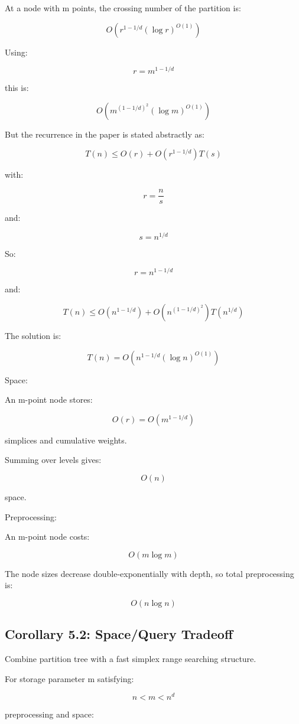 \documentclass[
  11pt,
]{article}
\begin{document}
At a node with m points, the crossing number of the partition is:

\[
O(r^{1-1/d}(\log r)^{O(1)})
\]

Using:

\[
r=m^{1-1/d}
\]

this is:

\[
O\left(m^{(1-1/d)^2}(\log m)^{O(1)}\right)
\]

But the recurrence in the paper is stated abstractly as:

\[
T(n)\le O(r)+O(r^{1-1/d})T(s)
\]

with:

\[
r=\frac{n}{s}
\]

and:

\[
s=n^{1/d}
\]

So:

\[
r=n^{1-1/d}
\]

and:

\[
T(n) \le O(n^{1-1/d}) + O(n^{(1-1/d)^2})T(n^{1/d})
\]

The solution is:

\[
T(n)=O(n^{1-1/d}(\log n)^{O(1)})
\]

Space:

An m-point node stores:

\[
O(r)=O(m^{1-1/d})
\]

simplices and cumulative weights.

Summing over levels gives:

\[
O(n)
\]

space.

Preprocessing:

An m-point node costs:

\[
O(m\log m)
\]

The node sizes decrease double-exponentially with depth, so total
preprocessing is:

\[
O(n\log n)
\]

\hypertarget{corollary-5.2-spacequery-tradeoff}{%
\subsection{Corollary 5.2: Space/Query
Tradeoff}\label{corollary-5.2-spacequery-tradeoff}}

Combine partition tree with a fast simplex range searching structure.

For storage parameter m satisfying:

\[
n< m< n^d
\]

preprocessing and space:
\end{document}

